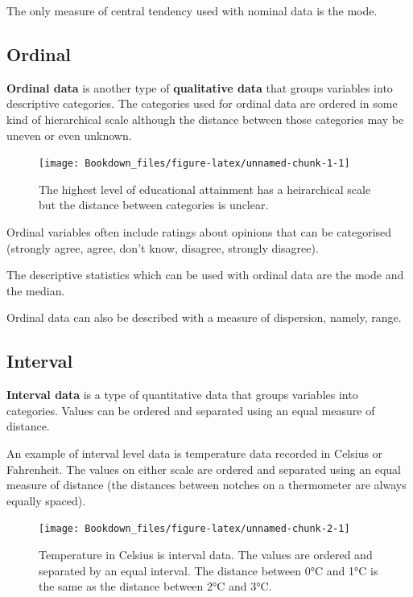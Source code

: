 \documentclass[
]{book}
\begin{document}
The only measure of central tendency used with nominal data is the mode.

\hypertarget{ordinal}{%
\subsection{Ordinal}\label{ordinal}}

\textbf{Ordinal data} is another type of \textbf{qualitative data} that groups variables into descriptive categories. The categories used for ordinal data are ordered in some kind of hierarchical scale although the distance between those categories may be uneven or even unknown.

\begin{figure}

{\centering \texttt{[image: Bookdown\_files/figure-latex/unnamed-chunk-1-1]} 

}

\caption{The highest level of educational attainment has a heirarchical scale but the distance between categories is unclear.}\label{fig:unnamed-chunk-1}
\end{figure}

Ordinal variables often include ratings about opinions that can be categorised (strongly agree, agree, don't know, disagree, strongly disagree).

The descriptive statistics which can be used with ordinal data are the mode and the median.

Ordinal data can also be described with a measure of dispersion, namely, range.

\hypertarget{interval}{%
\subsection{Interval}\label{interval}}

\textbf{Interval data} is a type of quantitative data that groups variables into categories. Values can be ordered and separated using an equal measure of distance.

An example of interval level data is temperature data recorded in Celsius or Fahrenheit. The values on either scale are ordered and separated using an equal measure of distance (the distances between notches on a thermometer are always equally spaced).

\begin{figure}

{\centering \texttt{[image: Bookdown\_files/figure-latex/unnamed-chunk-2-1]} 

}

\caption{Temperature in Celsius is interval data. The values are ordered and separated by an equal interval. The distance between 0°C and 1°C is the same as the distance between 2°C and 3°C.}\label{fig:unnamed-chunk-2}
\end{figure}
\end{document}
